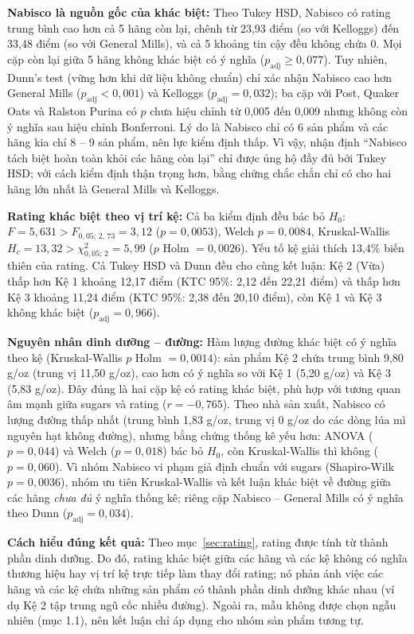 \documentclass[12pt,a4paper]{article}
\begin{document}
\textbf{Nabisco là nguồn gốc của khác biệt:} Theo Tukey HSD, Nabisco có rating trung
bình cao hơn cả 5 hãng còn lại, chênh từ 23,93 điểm (so với Kelloggs) đến 33,48 điểm (so với
General Mills), và cả 5 khoảng tin cậy đều không chứa 0. Mọi cặp còn lại giữa 5 hãng không khác
biệt có ý nghĩa ($p_{\text{adj}} \ge 0{,}077$). Tuy nhiên, Dunn's test (vững hơn khi dữ liệu
không chuẩn) chỉ xác nhận Nabisco cao hơn General Mills ($p_{\text{adj}} < 0{,}001$) và
Kelloggs ($p_{\text{adj}} = 0{,}032$); ba cặp với Post, Quaker Oats và Ralston Purina có $p$
chưa hiệu chỉnh từ 0,005 đến 0,009 nhưng không còn ý nghĩa sau hiệu chỉnh Bonferroni. Lý do là
Nabisco chỉ có 6 sản phẩm và các hãng kia chỉ 8 -- 9 sản phẩm, nên lực kiểm định thấp. Vì vậy,
nhận định ``Nabisco tách biệt hoàn toàn khỏi các hãng còn lại'' chỉ được ủng hộ đầy đủ bởi
Tukey HSD; với cách kiểm định thận trọng hơn, bằng chứng chắc chắn chỉ có cho hai hãng lớn
nhất là General Mills và Kelloggs.

\textbf{Rating khác biệt theo vị trí kệ:} Cả ba kiểm định đều bác bỏ $H_0$:
$F = 5{,}631 > F_{0,05;\,2,\,73} = 3{,}12$ ($p = 0{,}0053$), Welch $p = 0{,}0084$, Kruskal-Wallis
$H_c = 13{,}32 > \chi^2_{0,05;\,2} = 5{,}99$ ($p$ Holm $= 0{,}0026$). Yếu tố kệ giải thích
13,4\% biến thiên của rating. Cả Tukey HSD và Dunn đều cho cùng kết luận: Kệ 2 (Vừa) thấp hơn
Kệ 1 khoảng 12,17 điểm (KTC 95\%: 2,12 đến 22,21 điểm) và thấp hơn Kệ 3 khoảng 11,24 điểm
(KTC 95\%: 2,38 đến 20,10 điểm), còn Kệ 1 và Kệ 3 không khác biệt ($p_{\text{adj}} = 0{,}966$).

\textbf{Nguyên nhân dinh dưỡng -- đường:} Hàm lượng đường khác biệt có ý nghĩa theo kệ
(Kruskal-Wallis $p$ Holm $= 0{,}0014$): sản phẩm Kệ 2 chứa trung bình 9,80 g/oz (trung vị
11,50 g/oz), cao hơn có ý nghĩa so với Kệ 1 (5,20 g/oz) và Kệ 3 (5,83 g/oz). Đây đúng là hai
cặp kệ có rating khác biệt, phù hợp với tương quan âm mạnh giữa sugars và rating
($r = -0{,}765$). Theo nhà sản xuất, Nabisco có lượng đường thấp nhất (trung bình 1,83 g/oz,
trung vị 0 g/oz do các dòng lúa mì nguyên hạt không đường), nhưng bằng chứng thống kê yếu hơn:
ANOVA ($p = 0{,}044$) và Welch ($p = 0{,}018$) bác bỏ $H_0$, còn Kruskal-Wallis thì không
($p = 0{,}060$). Vì nhóm Nabisco vi phạm giả định chuẩn với sugars (Shapiro-Wilk
$p = 0{,}0036$), nhóm ưu tiên Kruskal-Wallis và kết luận khác biệt về đường giữa các hãng
\emph{chưa đủ} ý nghĩa thống kê; riêng cặp Nabisco -- General Mills có ý nghĩa theo Dunn
($p_{\text{adj}} = 0{,}034$).

\textbf{Cách hiểu đúng kết quả:} Theo mục~\ref{sec:rating}, rating được tính từ thành
phần dinh dưỡng. Do đó, rating khác biệt giữa các hãng và các kệ không có nghĩa thương hiệu hay
vị trí kệ trực tiếp làm thay đổi rating; nó phản ánh việc các hãng và các kệ chứa những sản
phẩm có thành phần dinh dưỡng khác nhau (ví dụ Kệ 2 tập trung ngũ cốc nhiều đường). Ngoài ra,
mẫu không được chọn ngẫu nhiên (mục 1.1), nên kết luận chỉ áp dụng cho nhóm sản phẩm tương tự.
\end{document}

